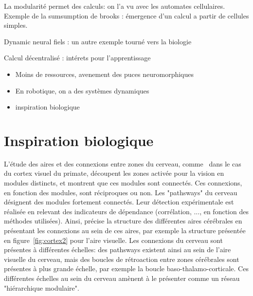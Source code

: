 La modularité permet des calculs: on l'a vu avec les automates cellulaires.
Exemple de la sumsumption de brooks : émergence d'un calcul a partir de cellules simples.

Dynamic neural fiels : un autre exemple tourné vers la biologie

Calcul décentralisé : intérets pour l'apprentissage
\begin{itemize}
    \item Moins de ressources, avenement des puces neuromorphiques
    \item En robotique, on a des systèmes dynamiques
    \item inspiration biologique
\end{itemize}



\section{Inspiration biologique}

L'étude des aires et des connexions entre zones du cerveau, comme~\cite{primate_cortex_91} dans le cas du cortex visuel du primate, découpent les zones activée pour la vision en modules distincts, et montrent que ces modules sont connectés. Ces connexions, en fonction des modules, sont réciproques ou non. Les "pathsways" du cerveau désignent des modules fortement connectés. Leur détection expérimentale est réalisée en relevant des indicateurs de dépendance (corrélation, ..., en fonction des méthodes utilisées). Ainsi, \cite{Rolls2002ComputationalNO} précise la structure des différentes aires cérébrales en présentant les connexions au sein de ces aires, par exemple la structure présentée en figure~\ref{fig:cortex2} pour l'aire visuelle. 
Les connexions du cerveau sont présentes à différentes échelles: des pathsways existent ainsi au sein de l'aire visuelle du cerveau, mais des boucles de rétroaction entre zones cérébrales sont présentes à plus grande échelle, par exemple la boucle baso-thalamo-corticale. Ces différentes échelles au sein du cerveau amènent \cite{Meunier2010ModularAH} à le présenter comme un réseau "hiérarchique modulaire".



